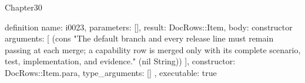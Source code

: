 \begin{lexlean}{Chapter30}
\begin{semanticmodule}
definition{
  name: i0023,
  parameters: [],
  result: DocRows::Item,
  body: constructor{
    arguments: [
      (cons "The default branch and every release line must remain passing at each merge; a capability row is merged only with its complete scenario, test, implementation, and evidence." (nil String))
    ],
    constructor: DocRows::Item.para,
    type_arguments: []
  },
  executable: true
}
\end{semanticmodule}
\end{lexlean}
